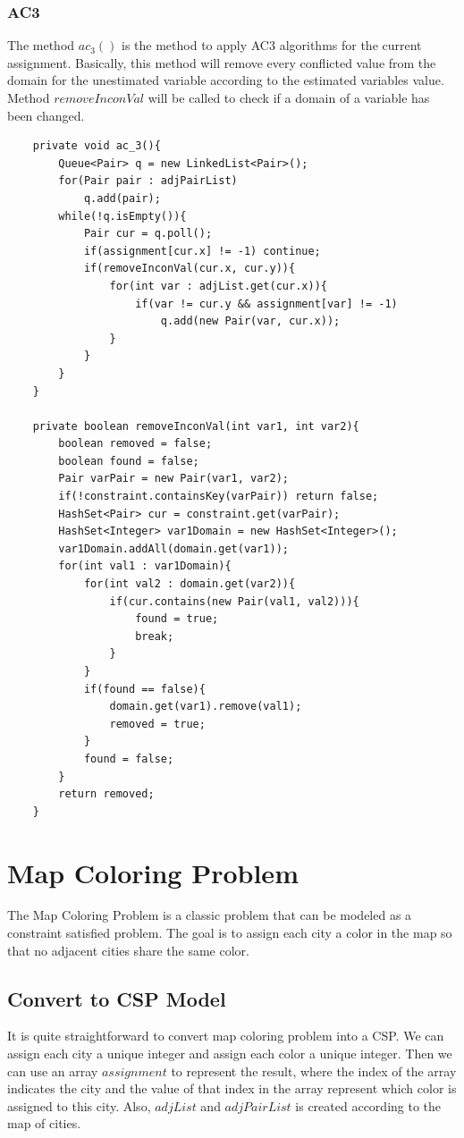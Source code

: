 \documentclass{article}
\begin{document}
\subsubsection{AC3}
The method $ac_3()$ is the method to apply AC3 algorithms for the current assignment. Basically, this method will remove every conflicted value from the domain for the unestimated variable according to the estimated variables value. Method $removeInconVal$ will be called to check if a domain of a variable has been changed. 
\begin{lstlisting}
	private void ac_3(){
		Queue<Pair> q = new LinkedList<Pair>();
		for(Pair pair : adjPairList)
			q.add(pair);
		while(!q.isEmpty()){
			Pair cur = q.poll();
			if(assignment[cur.x] != -1) continue;
			if(removeInconVal(cur.x, cur.y)){
				for(int var : adjList.get(cur.x)){
					if(var != cur.y && assignment[var] != -1)
						q.add(new Pair(var, cur.x));
				}
			}
		}
	}
	
	private boolean removeInconVal(int var1, int var2){
		boolean removed = false;
		boolean found = false;
		Pair varPair = new Pair(var1, var2);
		if(!constraint.containsKey(varPair)) return false;
		HashSet<Pair> cur = constraint.get(varPair);
		HashSet<Integer> var1Domain = new HashSet<Integer>();
		var1Domain.addAll(domain.get(var1));
		for(int val1 : var1Domain){
			for(int val2 : domain.get(var2)){
				if(cur.contains(new Pair(val1, val2))){
					found = true;
					break;
				}
			}
			if(found == false){
				domain.get(var1).remove(val1);
				removed = true;
			}
			found = false;
		}
		return removed;
	}
\end{lstlisting}

\section{Map Coloring Problem}
The Map Coloring Problem is a classic problem that can be modeled as a constraint satisfied problem. The goal is to assign each city a color in the map so that no adjacent cities share the same color.
\subsection{Convert to CSP Model}
It is quite straightforward to convert map coloring problem into a CSP. We can assign each city a unique integer and assign each color a unique integer. Then we can use an array $assignment$ to represent the result, where the index of the array indicates the city and the value of that index in the array represent which color is assigned to this city. Also, $adjList$ and $adjPairList$ is created according to the map of cities. 
\end{document}

